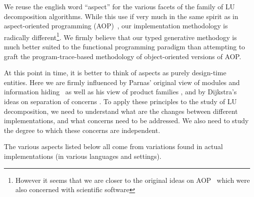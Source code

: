\documentclass[draft]{elsart}
\begin{document}
We reuse the english word ``aspect'' for the various facets of the family
of LU decomposition algorithms.  While this use if very much in the same 
spirit as in aspect-oriented programming (AOP)~\cite{kiczales97aspectoriented},
our implementation methodology is radically different\footnote{However it seems
that we are closer to the original ideas on AOP~\cite{709568,mendhekar97rg}
which were also concerned with scientific software}.  We firmly believe that
our typed generative methodogy is much better suited to the functional
programming paradigm than attempting to graft the program-trace-based
methodology of object-oriented versions of AOP.  

At this point in time, it is better to think of aspects as purely
design-time entities.  Here we are firmly influenced by Parnas' original
view of modules and information hiding~\cite{journals/cacm/parnas72a} as well
as his view of product families \cite{journals/tse/Parnas76}, and by
Dijkstra's ideas on separation of concerns \cite{EWD:EWD447}.
To apply these principles to the study of LU decomposition, we need
to understand what are the changes between different implementations, and 
what concerns need to be addressed.  We also need to study the degree
to which these concerns are independent.

The various aspects listed below all come from variations found in actual
implementations (in various languages and settings).
\end{document}

